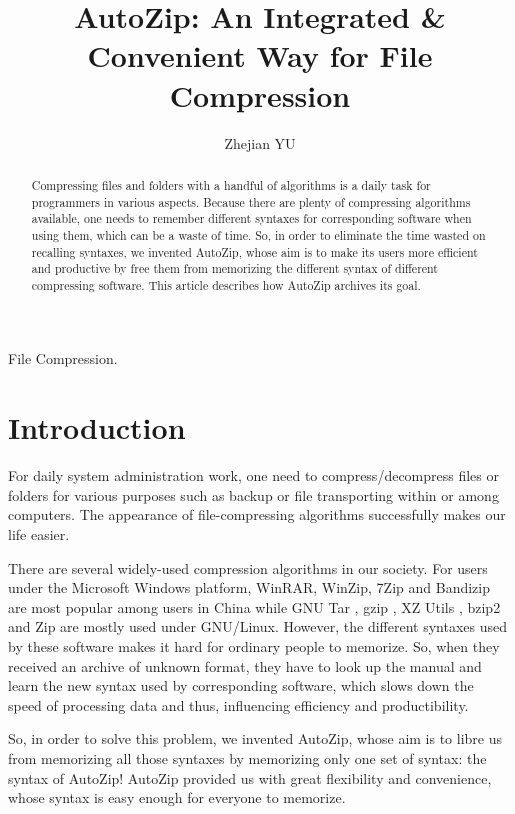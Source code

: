 \documentclass[journal,twocolumn]{IEEEtran}
\begin{document}

\title{AutoZip: An Integrated \& Convenient Way for File Compression}
\author{Zhejian YU }
\maketitle
\begin{abstract}
Compressing files and folders with a handful of algorithms is a daily task for programmers in various aspects. Because there are plenty of compressing algorithms available, one needs to remember different syntaxes for corresponding software when using them, which can be a waste of time. So, in order to eliminate the time wasted on recalling syntaxes, we invented AutoZip, whose aim is to make its users more efficient and productive by free them from memorizing the different syntax of different compressing software. This article describes how AutoZip archives its goal.
\end{abstract}
\begin{IEEEkeywords}
File Compression.
\end{IEEEkeywords}
\section{Introduction}
For daily system administration work, one need to compress/decompress files or folders for various purposes such as backup or file transporting within or among computers. The appearance of file-compressing algorithms successfully makes our life easier.\par
There are several widely-used compression algorithms in our society. For users under the Microsoft Windows platform, WinRAR, WinZip, 7Zip and Bandizip are most popular among users in China while GNU Tar \cite{tar}, gzip \cite{gzip}, XZ Utils \cite{xz}, bzip2 \cite{bzip2} and Zip are mostly used under GNU/Linux. However, the different syntaxes used by these software makes it hard for ordinary people to memorize. So, when they received an archive of unknown format, they have to look up the manual and learn the new syntax used by corresponding software, which slows down the speed of processing data and thus, influencing efficiency and productibility.\par
So, in order to solve this problem, we invented AutoZip, whose aim is to libre us from memorizing all those syntaxes by memorizing only one set of syntax: the syntax of AutoZip! AutoZip provided us with great flexibility and convenience, whose syntax is easy enough for everyone to memorize.
\end{document}
